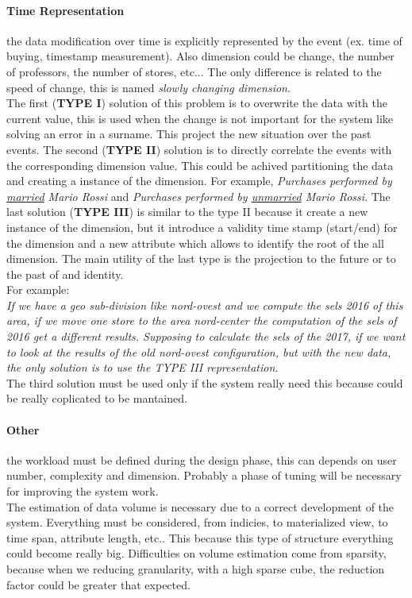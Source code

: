\documentclass[12pt]{article}
\begin{document}
\paragraph{Time Representation} the data modification over time is explicitly represented by the event (ex. time of buying, timestamp measurement). Also dimension could be change, the number of professors, the number of stores, etc... The only difference is related to the speed of change, this is named \textit{slowly changing dimension}.\\
The first (\textbf{TYPE I}) solution of this problem is to overwrite the data with the current value, this is used when the change is not important for the system like solving an error in a surname. This project the new situation over the past events. The second (\textbf{TYPE II}) solution is to directly correlate the events with the corresponding dimension value. This could be achived partitioning the data and creating a instance of the dimension. For example, \textit{Purchases performed by \underline{married} Mario Rossi} and \textit{Purchases performed by \underline{unmarried} Mario Rossi}.
The last solution (\textbf{TYPE III}) is similar to the type II because it create a new instance of the dimension, but it introduce a validity time stamp (start/end) for the dimension and a new attribute which allows to identify the root of the all dimension. The main utility of the last type is the projection to the future or to the past of and identity.\\

For example:\\
\textit{If we have a geo sub-division like nord-ovest and we compute the sels 2016 of this area, if we move one store to the area nord-center the computation of the sels of 2016 get a different results. Supposing to calculate the sels of the 2017, if we want to look at the results of the old nord-ovest configuration, but with the new data, the only solution is to use the TYPE III representation. }\\

The third solution must be used only if the system really need this because could be really coplicated to be mantained.

\paragraph{Other} the workload must be defined during the design phase, this can depends on user number, complexity and dimension. Probably a phase of tuning will be necessary for improving the system work.\\
The estimation of data volume is necessary due to a correct development of the system. Everything must be considered, from indicies, to materialized view, to time span, attribute length, etc.. This because this type of structure everything could become really big. Difficulties on volume estimation come from sparsity, because when we reducing granularity, with a high sparse cube, the reduction factor could be greater that expected.
\end{document}
